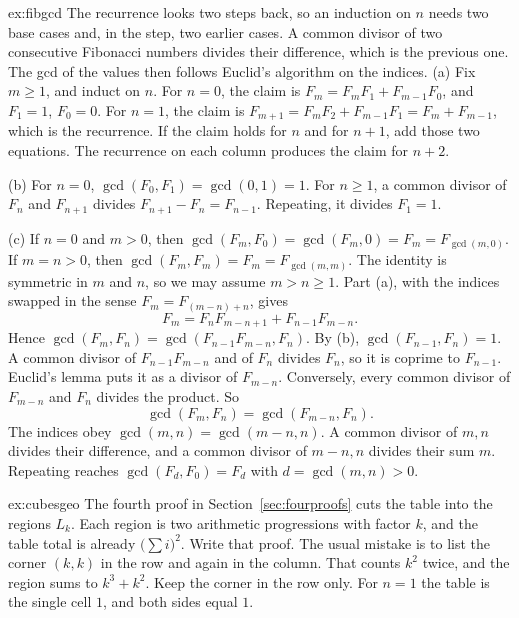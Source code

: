 \begin{solution}{ex:fibgcd}
\idea The recurrence looks two steps back, so an induction on $n$ needs two base cases and, in the step, two earlier cases. A common divisor of two consecutive Fibonacci numbers divides their difference, which is the previous one. The gcd of the values then follows Euclid's algorithm on the indices.
\writeup (a) Fix $m\ge1$, and induct on $n$. For $n=0$, the claim is $F_m=F_m F_1+F_{m-1}F_0$, and $F_1=1$, $F_0=0$. For $n=1$, the claim is $F_{m+1}=F_m F_2+F_{m-1}F_1=F_m+F_{m-1}$, which is the recurrence. If the claim holds for $n$ and for $n+1$, add those two equations. The recurrence on each column produces the claim for $n+2$.

(b) For $n=0$, $\gcd(F_0,F_1)=\gcd(0,1)=1$. For $n\ge1$, a common divisor of $F_n$ and $F_{n+1}$ divides $F_{n+1}-F_n=F_{n-1}$. Repeating, it divides $F_1=1$.

(c) If $n=0$ and $m>0$, then $\gcd(F_m,F_0)=\gcd(F_m,0)=F_m=F_{\gcd(m,0)}$. If $m=n>0$, then $\gcd(F_m,F_m)=F_m=F_{\gcd(m,m)}$. The identity is symmetric in $m$ and $n$, so we may assume $m>n\ge1$. Part (a), with the indices swapped in the sense $F_m=F_{(m-n)+n}$, gives
\[
F_m=F_n F_{m-n+1}+F_{n-1}F_{m-n}.
\]
Hence $\gcd(F_m,F_n)=\gcd(F_{n-1}F_{m-n},F_n)$. By (b), $\gcd(F_{n-1},F_n)=1$. A common divisor of $F_{n-1}F_{m-n}$ and of $F_n$ divides $F_n$, so it is coprime to $F_{n-1}$. Euclid's lemma puts it as a divisor of $F_{m-n}$. Conversely, every common divisor of $F_{m-n}$ and $F_n$ divides the product. So
\[
\gcd(F_m,F_n)=\gcd(F_{m-n},F_n).
\]
The indices obey $\gcd(m,n)=\gcd(m-n,n)$. A common divisor of $m,n$ divides their difference, and a common divisor of $m-n,n$ divides their sum $m$. Repeating reaches $\gcd(F_d,F_0)=F_d$ with $d=\gcd(m,n)>0$.
\end{solution}

\begin{solution}{ex:cubesgeo}
\idea The fourth proof in Section~\ref{sec:fourproofs} cuts the table into the regions $L_k$. Each region is two arithmetic progressions with factor $k$, and the table total is already $\bigl(\sum i\bigr)^2$.
\writeup Write that proof. The usual mistake is to list the corner $(k,k)$ in the row and again in the column. That counts $k^2$ twice, and the region sums to $k^3+k^2$. Keep the corner in the row only. For $n=1$ the table is the single cell $1$, and both sides equal $1$.
\end{solution}

